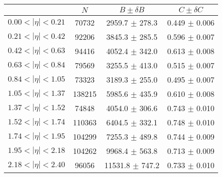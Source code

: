 \begin{tabular}{lccc}
\hline
    &   $N$   & $B \pm \delta B$  &  $C \pm \delta C$ \\
\hline
$0.00 < |\eta| <0.21$          & 70732      & 2959.7     $\pm$ 278.3 & 0.449      $\pm$ 0.006 \\
$0.21 < |\eta| <0.42$          & 92206      & 3845.3     $\pm$ 285.5 & 0.596      $\pm$ 0.007 \\
$0.42 < |\eta| <0.63$          & 94416      & 4052.4     $\pm$ 342.0 & 0.613      $\pm$ 0.008 \\
$0.63 < |\eta| <0.84$          & 79569      & 3255.5     $\pm$ 413.0 & 0.515      $\pm$ 0.007 \\
$0.84 < |\eta| <1.05$          & 73323      & 3189.3     $\pm$ 255.0 & 0.495      $\pm$ 0.007 \\
$1.05 < |\eta| <1.37$          & 138215     & 5985.6     $\pm$ 435.9 & 0.610      $\pm$ 0.008 \\
$1.37 < |\eta| <1.52$          & 74848      & 4054.0     $\pm$ 306.6 & 0.743      $\pm$ 0.010 \\
$1.52 < |\eta| <1.74$          & 110363     & 6404.5     $\pm$ 332.1 & 0.748      $\pm$ 0.010 \\
$1.74 < |\eta| <1.95$          & 104299     & 7255.3     $\pm$ 489.8 & 0.744      $\pm$ 0.009 \\
$1.95 < |\eta| <2.18$          & 104262     & 9968.4     $\pm$ 563.8 & 0.713      $\pm$ 0.009 \\
$2.18 < |\eta| <2.40$          & 96056      & 11531.8    $\pm$ 747.2 & 0.733      $\pm$ 0.010 \\
\hline
\end{tabular}
